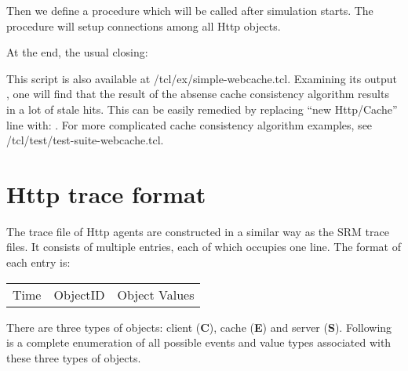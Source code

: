 Then we define a procedure which will be called after simulation
starts.  The procedure will setup connections among all Http objects.

At the end, the usual closing:

This script is also available at \ns/tcl/ex/simple-webcache.tcl. 
Examining its output , one will find that the result of 
the absense cache consistency algorithm results in a lot of stale hits. 
This can be easily remedied by replacing ``new Http/Cache'' line with:
. For more complicated
cache consistency algorithm examples, see 
\ns/tcl/test/test-suite-webcache.tcl.

\section{Http trace format}
\label{sec:webcache-trace}

The trace file of Http agents are constructed in a similar way as the
SRM trace files. It consists of multiple entries, each of which
occupies one line.  The format of each entry is:

\begin{tabular}[h]{c|c|c}
  Time & ObjectID & Object Values
\end{tabular}

There are three types of objects: client ({\bf C}), cache ({\bf E})
and server ({\bf S}). Following is a complete enumeration of all possible 
events and value types associated with these three types of objects.

